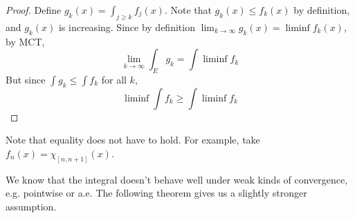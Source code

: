   \begin{proof}
    Define $g_k (x) = \int_{j \geq k} f_j (x)$. Note that $g_k (x) \leq f_k (x)$ by definition, and $g_k (x)$ is increasing. Since by definition $\lim_{k \to \infty} g_k (x) = \liminf f_k (x)$, by MCT, 
    \begin{equation}
      \lim_{k \to \infty} \int_E g_k = \int \liminf f_k 
    \end{equation}
    But since $\int g_k \leq \int f_k$ for all $k$, 
    \begin{equation}
      \liminf \int f_k \geq \int \liminf f_k 
    \end{equation}
  \end{proof}

  Note that equality does not have to hold. For example, take $f_n (x) = \chi_{[n, n+1]} (x)$. 


  We know that the integral doesn't behave well under weak kinds of convergence, e.g. pointwise or a.e. The following theorem gives us a slightly stronger assumption. 


